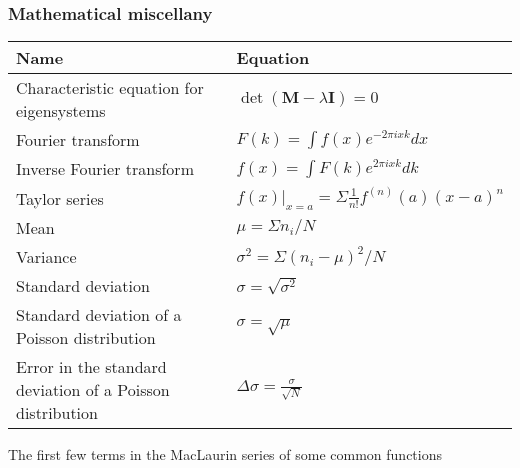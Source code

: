 \documentclass[11pt]{paper}
\begin{document}
\newpage

\subsubsection*{Mathematical miscellany}
\label{subsec:misc}
\centering
\label{my-label}
\bgroup
\def\arraystretch{2}
\begin{longtable}{ll}
\textbf{Name}       & \textbf{Equation}          \\ \hline
\multicolumn{1}{|l|}{Characteristic equation for eigensystems} & \multicolumn{1}{l|}{$\det\left(\mathbf{M}-\lambda\mathbf{I}\right)=0$} \\ \hline
\multicolumn{1}{|l|}{Fourier transform} & \multicolumn{1}{l|}{$F(k) = \int f(x)e^{-2\pi i x k} dx$} \\ \hline
\multicolumn{1}{|l|}{Inverse Fourier transform} & \multicolumn{1}{l|}{$f(x) = \int F(k)e^{2\pi i x k} dk$} \\ \hline
\multicolumn{1}{|l|}{Taylor series} & \multicolumn{1}{l|}{$f(x)|_{x=a} = \Sigma \frac{1}{n!}f^{(n)}(a)(x-a)^n$} \\ \hline
\multicolumn{1}{|l|}{Mean} & \multicolumn{1}{l|}{$\mu = \Sigma n_i / N$} \\ \hline
\multicolumn{1}{|l|}{Variance} & \multicolumn{1}{l|}{$\sigma^2 = \Sigma(n_i - \mu)^2/N$} \\ \hline
\multicolumn{1}{|l|}{Standard deviation} & \multicolumn{1}{l|}{$\sigma = \sqrt{\sigma^2}$} \\ \hline
\multicolumn{1}{|l|}{Standard deviation of a Poisson distribution} & \multicolumn{1}{l|}{$\sigma = \sqrt{\mu}$} \\ \hline
\multicolumn{1}{|l|}{Error in the standard deviation of a Poisson distribution} & \multicolumn{1}{l|}{$\Delta\sigma = \frac{\sigma}{\sqrt{N}}$} \\ \hline
\end{longtable}
\label{my-label}
\bgroup
The first few terms in the MacLaurin series of some common functions
\def\arraystretch{2}
\end{document}
